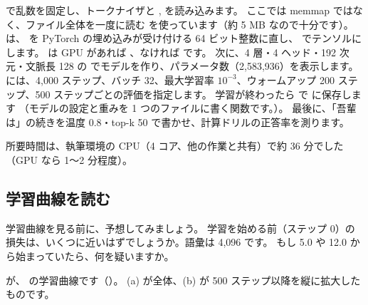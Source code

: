  で乱数を固定し、トークナイザと ,  を読み込みます。
ここでは memmap ではなく、ファイル全体を一度に読む  を使っています（約 5 MB なので十分です）。
 は、 を PyTorch の埋め込みが受け付ける 64 ビット整数に直し、 でテンソルにします。
 は GPU があれば 、なければ  です。
次に、4 層・4 ヘッド・192 次元・文脈長 128 の  でモデルを作り、パラメータ数（2,583,936）を表示します。
 には、4,000 ステップ、バッチ 32、最大学習率 $10^{-3}$、ウォームアップ 200 ステップ、500 ステップごとの評価を指定します。
学習が終わったら  で  に保存します
（モデルの設定と重みを 1 つのファイルに書く関数です。）。
最後に、「吾輩は」の続きを温度 0.8・top-k 50 で書かせ、計算ドリルの正答率を測ります。

所要時間は、執筆環境の CPU（4 コア、他の作業と共有）で約 36 分でした（GPU なら 1〜2 分程度）。

\subsection{学習曲線を読む}

\begin{quiz}
学習曲線を見る前に、予想してみましょう。
学習を始める前（ステップ 0）の損失は、いくつに近いはずでしょうか。語彙は 4,096 です。
もし 5.0 や 12.0 から始まっていたら、何を疑いますか。
\end{quiz}

が、 の学習曲線です（）。
(a) が全体、(b) が 500 ステップ以降を縦に拡大したものです。

